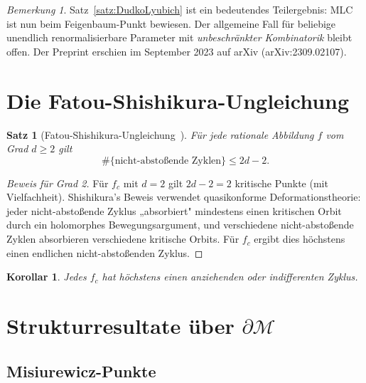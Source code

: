 \documentclass[12pt,a4paper]{amsart}
\newtheorem{satz}[theorem]{Satz}
\newtheorem{korollar}[theorem]{Korollar}
\theoremstyle{definition}
\theoremstyle{remark}
\newtheorem{bemerkung}[theorem]{Bemerkung}
\begin{document}
\begin{bemerkung}
Satz~\ref{satz:DudkoLyubich} ist ein bedeutendes Teilergebnis: MLC ist
nun beim Feigenbaum-Punkt bewiesen.  Der allgemeine Fall für beliebige
unendlich renormalisierbare Parameter mit \emph{unbeschränkter Kombinatorik}
bleibt offen.  Der Preprint erschien im September 2023 auf arXiv
(arXiv:2309.02107).
\end{bemerkung}

\section{Die Fatou-Shishikura-Ungleichung}

\begin{satz}[Fatou-Shishikura-Ungleichung~\cite{Shishikura1987}]
Für jede rationale Abbildung $f$ vom Grad $d \geq 2$ gilt
\[
    \#\{\text{nicht-abstoßende Zyklen}\} \leq 2d - 2.
\]
\end{satz}

\begin{proof}[Beweis für Grad 2]
Für $f_c$ mit $d=2$ gilt $2d-2=2$ kritische Punkte (mit Vielfachheit).
Shishikura's Beweis verwendet quasikonforme Deformationstheorie: jeder
nicht-abstoßende Zyklus „absorbiert" mindestens einen kritischen Orbit
durch ein holomorphes Bewegungsargument, und verschiedene nicht-abstoßende
Zyklen absorbieren verschiedene kritische Orbits. Für $f_c$ ergibt dies
höchstens einen endlichen nicht-abstoßenden Zyklus.
\end{proof}

\begin{korollar}
Jedes $f_c$ hat höchstens einen anziehenden oder indifferenten Zyklus.
\end{korollar}

\section{Strukturresultate über $\partial\mathcal{M}$}

\subsection{Misiurewicz-Punkte}
\end{document}

